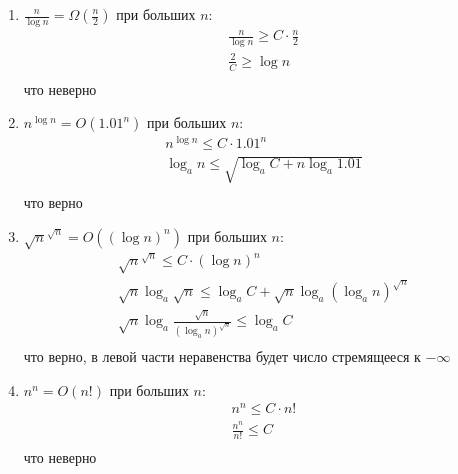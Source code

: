 \begin{solution}
\begin{enumerate}
    \item $\frac{n}{\log n} = \Omega\!\left(\frac{n}{2}\right)$
    при больших $n$:
    \begin{equation*}
        \begin{split}  
            \frac{n}{\log n} \geqslant C\cdot\frac{n}{2}\\
            \frac{2}{C} \geqslant \log n\\
        \end{split}
    \end{equation*} что неверно
    \item $n^{\log n} = O\!\left(1.01^n\right)$
    при больших $n$:
    \begin{equation*}
        \begin{split}  
            n^{\log n} \leqslant C\cdot1.01^n\\
            \log_a n \leqslant \sqrt{\log_a C + n\log_a1.01}\\
        \end{split}
    \end{equation*} что верно
    \item $\sqrt{n}^{\sqrt{n}} = O\!\left(\left(\log n\right)^n\right)$
    при больших $n$:
    \begin{equation*}
        \begin{split}  
            \sqrt{n}^{\sqrt{n}} \leqslant C\cdot\left(\log n\right)^n\\
            \sqrt n \log_a \sqrt n \leqslant \log_a C + \sqrt n \log_a{(\log_a n)^\sqrt n}\\
            \sqrt n \log_a{\frac{\sqrt n}{(\log_a n)^\sqrt n}} \leqslant \log_a C\\
        \end{split}
    \end{equation*} что верно, в левой части неравенства будет число стремящееся к $-\infty$
    \item $n^n = O\!\left(n!\right)$
    при больших $n$:
    \begin{equation*}
        \begin{split}  
            n^n \leqslant C\cdot n!\\
            \frac{n^n}{n!}\leqslant C\\
        \end{split}
    \end{equation*} что неверно
\end{enumerate}
\end{solution}